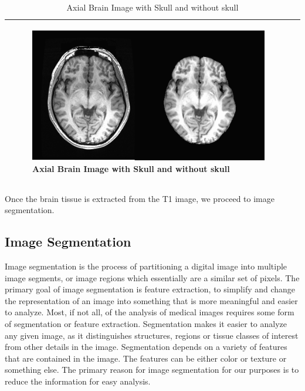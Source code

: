 \documentclass[12pt]{article}
\begin{document}
\begin{table}[H]
\begin{tabular} {| m{3.3cm} | m{11.5cm} | }
    \begin{minipage}{.6\textwidth}
    \begin{figure}[H]
      \captionsetup{singlelinecheck = false, justification=justified}
      \includegraphics[width=\linewidth]{./.img/test.png}
      \caption{Axial Brain Image with Skull and without skull}%
      \label{fig:axial_brain_image_with_skull}
    \end{figure}
    \end{minipage}

    \\ \hline

  \end{tabular}
\end{table}

Once the brain tissue is extracted from the T1 image, we proceed to
image segmentation.

\newpage
\subsection{Image Segmentation}

Image segmentation is the process of partitioning a digital image into
multiple image segments, or image regions which essentially are a
similar set of pixels. The primary goal of image segmentation is
feature extraction, to simplify and change the representation of an
image into something that is more meaningful and easier to analyze.
Most, if not all, of the analysis of medical images requires some form
of segmentation or feature extraction. Segmentation makes it easier
to analyze any given image, as it distinguishes structures, regions or
tissue classes of interest from other details in the image.
Segmentation depends on a variety of features that are contained in
the image. The features can be either color or texture or something
else. The primary reason for image segmentation for our purposes is to
reduce the information for easy analysis.
\end{document}
